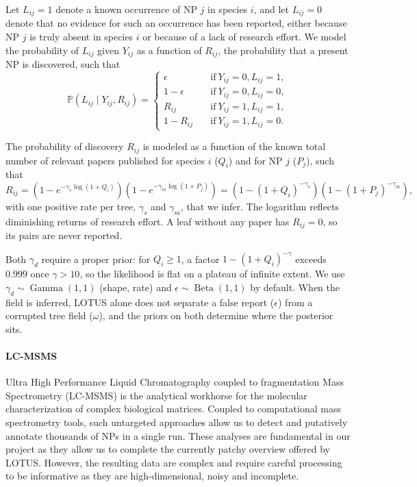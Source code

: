\documentclass[
11pt, %
oneside, %
english, %
singlespacing, %
headsepline, %
chapterinoneline, %
]{MastersDoctoralThesis} %
\DeclareMathOperator{\GammaDist}{Gamma}
\DeclareMathOperator{\BetaDist}{Beta}
\def\P{\mathbb{P}}
\begin{document}
Let $L_{ij} = 1$ denote a known occurrence of NP $j$ in species $i$, and let $L_{ij}=0$ denote that no evidence for such an occurrence has been reported, either because NP $j$ is truly absent in species $i$ or because of a lack of research effort. We model the probability of $L_{ij}$ given $Y_{ij}$ as a function of $R_{ij}$, the probability that a present NP is discovered, such that
\begin{equation*}
	\P(L_{ij} \mid Y_{ij}, R_{ij}) =
	\begin{cases}
		\epsilon \quad   & \mathrm{if\ } Y_{ij}=0, L_{ij} = 1, \\
		1-\epsilon \quad & \mathrm{if\ } Y_{ij}=0, L_{ij} = 0, \\
		R_{ij} \quad     & \mathrm{if\ } Y_{ij}=1, L_{ij} = 1, \\
		1- R_{ij} \quad  & \mathrm{if\ } Y_{ij}=1, L_{ij} = 0.
	\end{cases}
\end{equation*}

The probability of discovery $R_{ij}$ is modeled as a function of the known total number of relevant papers published for species $i$ ($Q_i$) and for NP $j$ ($P_j$), such that
\begin{equation*}
	R_{ij} = \left(1 - e^{-\gamma_s \log(1 + Q_i)}\right) \left(1 - e^{-\gamma_m \log(1 + P_j)}\right) = \left(1 - (1+Q_i)^{-\gamma_s}\right) \left(1 - (1+P_j)^{-\gamma_m}\right),
\end{equation*}
with one positive rate per tree, $\gamma_s$ and $\gamma_m$, that we infer. The logarithm reflects diminishing returns of research effort. A leaf without any paper has $R_{ij} = 0$, so its pairs are never reported.

Both $\gamma_d$ require a proper prior: for $Q_i \geq 1$, a factor $1 - (1+Q_i)^{-\gamma}$ exceeds $0.999$ once $\gamma > 10$, so the likelihood is flat on a plateau of infinite extent. We use $\gamma_d \sim \GammaDist(1,1)$ (shape, rate) and $\epsilon \sim \BetaDist(1,1)$ by default. When the field is inferred, LOTUS alone does not separate a false report ($\epsilon$) from a corrupted tree field ($\omega$), and the priors on both determine where the posterior sits.

\paragraph{LC-MSMS}\label{sec:ModellingLCMS}

Ultra High Performance Liquid Chromatography coupled to fragmentation Mass Spectrometry (LC-MSMS) is the analytical workhorse for the molecular characterization of complex biological matrices. Coupled to computational mass spectrometry tools, such untargeted approaches allow us to detect and putatively annotate thousands of NPs in a single run. These analyses are fundamental in our project as they allow us to complete the currently patchy overview offered by LOTUS. However, the resulting data are complex and require careful processing to be informative as they are high-dimensional, noisy and incomplete.
\end{document}
